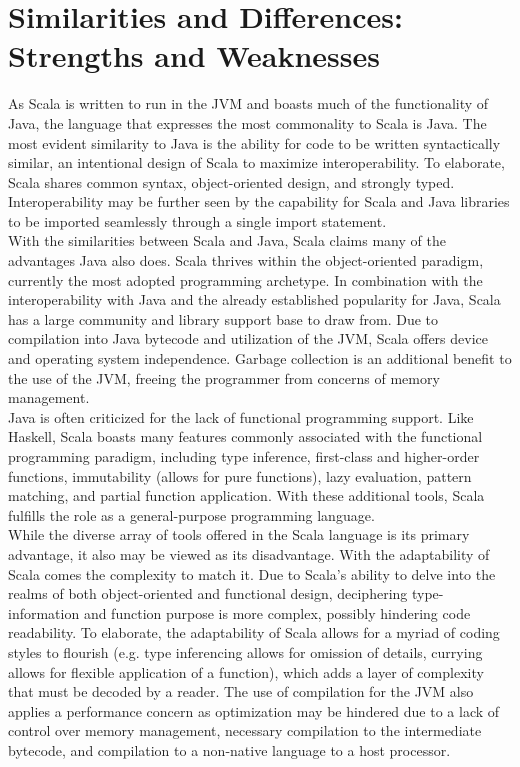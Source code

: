 \documentclass[12pt]{report}
\begin{document}
\section*{Similarities and Differences: Strengths and Weaknesses}

As Scala is written to run in the JVM and boasts much of the functionality of Java, the language that expresses the most commonality to Scala is Java. The most evident similarity to Java is the ability for code to be written syntactically similar, an intentional design of Scala to maximize interoperability. To elaborate, Scala shares common syntax, object-oriented design, and strongly typed. Interoperability may be further seen by the capability for Scala and Java libraries to be imported seamlessly through a single import statement. \\
With the similarities between Scala and Java, Scala claims many of the advantages Java also does. Scala thrives within the object-oriented paradigm, currently the most adopted programming archetype. In combination with the interoperability with Java and the already established popularity for Java, Scala has a large community and library support base to draw from. Due to compilation into Java bytecode and utilization of the JVM, Scala offers device and operating system independence. Garbage collection is an additional benefit to the use of the JVM, freeing the programmer from concerns of memory management.  \\
Java is often criticized for the lack of functional programming support. Like Haskell, Scala boasts many features commonly associated with the functional programming paradigm, including type inference, first-class and higher-order functions, immutability (allows for pure functions), lazy evaluation, pattern matching, and partial function application. With these additional tools, Scala fulfills the role as a general-purpose programming language. \\
While the diverse array of tools offered in the Scala language is its primary advantage, it also may be viewed as its disadvantage. With the adaptability of Scala comes the complexity to match it. Due to Scala’s ability to delve into the realms of both object-oriented and functional design, deciphering type-information and function purpose is more complex, possibly hindering code readability. To elaborate, the adaptability of Scala allows for a myriad of coding styles to flourish (e.g. type inferencing allows for omission of details, currying allows for flexible application of a function), which adds a layer of complexity that must be decoded by a reader. The use of compilation for the JVM also applies a performance concern as optimization may be hindered due to a lack of control over memory management, necessary compilation to the intermediate bytecode, and compilation to a non-native language to a host processor. \\
\end{document}
